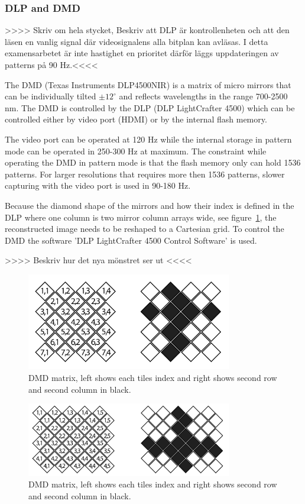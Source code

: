 \subsubsection{DLP and DMD}
>>>> Skriv om hela stycket, Beskriv att DLP är kontrollenheten och att den läsen en vanlig signal där videosignalens alla bitplan kan avläsas. I detta examensarbetet är inte hastighet en prioritet därför läggs uppdateringen av patterns på 90 Hz.<<<<

The DMD (Texas Instruments DLP4500NIR) is a matrix of micro mirrors that can be individually tilted $\pm 12^{\circ}$ and reflects wavelengths in the range 700-2500 nm. The DMD is controlled by the DLP (DLP LightCrafter 4500) which can be controlled either by video port (HDMI) or by the internal flash memory. 

The video port can be operated at 120 Hz while the internal storage in pattern mode can be operated in 250-300 Hz at maximum. The constraint while operating the DMD in pattern mode is that the flash memory only can hold 1536 patterns. For larger resolutions that requires more then 1536 patterns, slower capturing with the video port is used in 90-180 Hz. 


Because the diamond shape of the mirrors and how their index is defined in the DLP where one column is two mirror column arrays wide, see figure~\ref{fig:dmd_index}, the reconstructed image needs to be reshaped to a Cartesian grid. To control the DMD the software 'DLP LightCrafter 4500 Control Software' is used. \cite{manual:DLP}

>>>> Beskriv hur det nya mönstret ser ut <<<<


\begin{figure}[H]
    \centering
    \includegraphics[width = 0.8\textwidth]{gfx/DMD_grid.png}
    \caption{DMD matrix, left shows each tiles index and right shows second row and second column in black.}
    \label{fig:dmd_index}
\end{figure}

\begin{figure}[H]
    \centering
    \includegraphics[width = 0.8\textwidth]{gfx/DMD_grid2.png}
    \caption{DMD matrix, left shows each tiles index and right shows second row and second column in black.}
    \label{fig:dmd_index2}
\end{figure}


